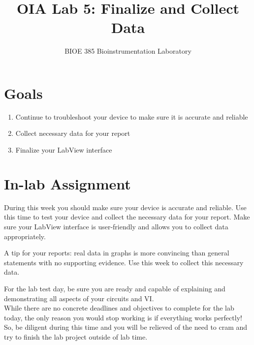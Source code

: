\documentclass{article}
\title{OIA Lab 5: Finalize and Collect Data}
\author{BIOE 385 Bioinstrumentation Laboratory}
\date{}
\begin{document}
\large
\maketitle

\section*{Goals}
\begin{enumerate}
	\item Continue to troubleshoot your device to make sure it is accurate and reliable
	\item Collect necessary data for your report
	\item Finalize your LabView interface
\end{enumerate}


\section*{In-lab Assignment}
During this week you should make sure your device is accurate and reliable. Use this time to test your device and collect the necessary data for your report. Make sure your LabView interface is user-friendly and allows you to collect data appropriately.

\begin{info}
A tip for your reports: real data in graphs is more convincing than general statements with no supporting evidence. Use this week to collect this necessary data.
\end{info}


For the lab test day, be sure you are ready and capable of explaining and demonstrating all aspects of your circuits and VI.\\

While there are no concrete deadlines and objectives to complete for the lab today, the only reason you would stop working is if everything works perfectly! So, be diligent during this time and you will be relieved of the need to cram and try to finish the lab project outside of lab time.
\end{document}

